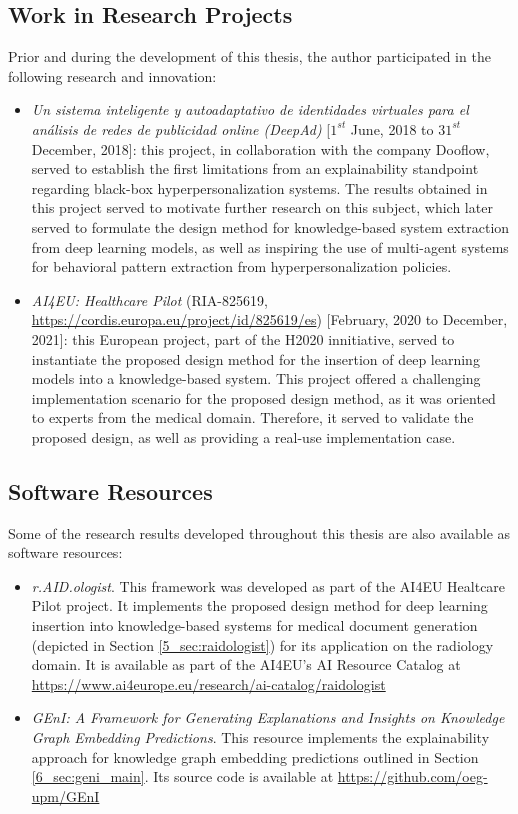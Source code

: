 \subsection{Work in Research Projects}
Prior and during the development of this thesis, the author participated in the following research and innovation:
\begin{itemize}
    \item \textit{Un sistema inteligente y autoadaptativo de identidades virtuales para el análisis de redes de publicidad online (DeepAd)} [$1^{st}$ June, 2018 to $31^{st}$ December, 2018]: this project, in collaboration with the company Dooflow, served to establish the first limitations from an explainability standpoint regarding black-box hyperpersonalization systems. The results obtained in this project served to motivate further research on this subject, which later served to formulate the design method for knowledge-based system extraction from deep learning models, as well as inspiring the use of multi-agent systems for behavioral pattern extraction from hyperpersonalization policies.
    
    \item \textit{AI4EU: Healthcare Pilot} (RIA-825619, \url{https://cordis.europa.eu/project/id/825619/es}) [February, 2020 to December, 2021]: this European project, part of the H2020 innitiative, served to instantiate the proposed design method for the insertion of deep learning models into a knowledge-based system. This project offered a challenging implementation scenario for the proposed design method, as it was oriented to experts from the medical domain. Therefore, it served to validate the proposed design, as well as providing a real-use implementation case. 
\end{itemize}
\subsection{Software Resources}
Some of the research results developed throughout this thesis are also available as software resources:
\begin{itemize}
    \item \textit{r.AID.ologist}. This framework was developed as part of the AI4EU Healtcare Pilot project. It implements the proposed design method for deep learning insertion into knowledge-based systems for medical document generation (depicted in Section \ref{5_sec:raidologist}) for its application on the radiology domain. It is available as part of the AI4EU's AI Resource Catalog at \url{https://www.ai4europe.eu/research/ai-catalog/raidologist}
    
    \item \textit{GEnI: A Framework for Generating Explanations and Insights on Knowledge Graph Embedding Predictions}. This resource implements the explainability approach for knowledge graph embedding predictions outlined in Section \ref{6_sec:geni_main}. Its source code is available at \url{https://github.com/oeg-upm/GEnI}
\end{itemize}
